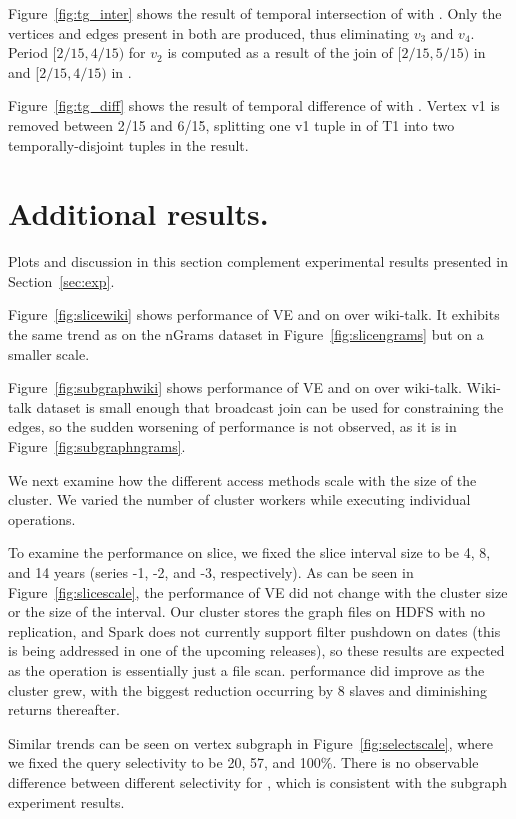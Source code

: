 Figure~\ref{fig:tg_inter} shows the result of temporal intersection
of  with .  Only the vertices and edges present in
both \tgs are produced, thus eliminating $v_3$ and $v_4$.  Period
$[2/15, 4/15)$ for $v_2$ is computed as a result of the join of
$[2/15, 5/15)$ in  and [$2/15, 4/15)$ in .

Figure~\ref{fig:tg_diff} shows the result of temporal difference
of  with .  Vertex v1 is removed between 2/15 and
6/15, splitting one v1 tuple in \tv of T1 into two temporally-disjoint
tuples in the result.

\section{Additional results.}
\label{sec:app2}

Plots and discussion in this section complement experimental results
presented in Section~\ref{sec:exp}.

Figure~\ref{fig:slicewiki} shows performance of VE and \sg
on  over wiki-talk.  It exhibits the same trend as on the
nGrams dataset in Figure~\ref{fig:slicengrams} but on a smaller scale.

Figure~\ref{fig:subgraphwiki} shows performance of VE and \sg
on  over wiki-talk.  Wiki-talk dataset is small
enough that broadcast join can be used for constraining the edges, so
the sudden worsening of performance is not observed, as it is in
Figure~\ref{fig:subgraphngrams}.

We next examine how the different access methods scale with the size
of the cluster.  We varied the number of cluster workers while
executing individual operations.

To examine the performance on slice, we fixed the slice interval size
to be 4, 8, and 14 years (series -1, -2, and -3, respectively).  As
can be seen in Figure~\ref{fig:slicescale}, the performance of VE did
not change with the cluster size or the size of the interval.  Our
cluster stores the graph files on HDFS with no replication, and Spark
does not currently support filter pushdown on dates (this is being
addressed in one of the upcoming releases), so these results are
expected as the operation is essentially just a file scan.  \rg
performance did improve as the cluster grew, with the biggest
reduction occurring by 8 slaves and diminishing returns thereafter. 

Similar trends can be seen on vertex subgraph in
Figure~\ref{fig:selectscale}, where we fixed the query selectivity to
be 20, 57, and 100\%.  There is no observable difference between
different selectivity for \rg, which is consistent with the subgraph
experiment results.


